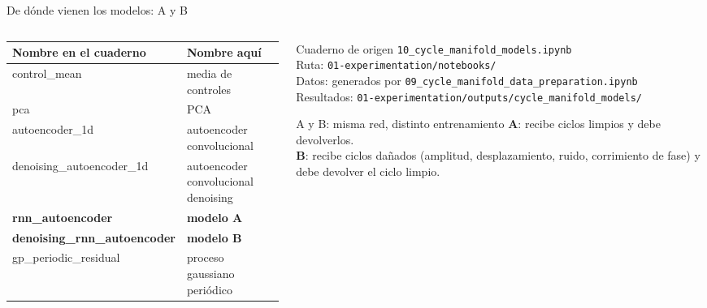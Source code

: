 \documentclass[aspectratio=169,10pt,t]{beamer}
\begin{document}
\begin{frame}{De dónde vienen los modelos: A y B}
\begin{columns}[T]
\begin{column}{0.56\textwidth}
\footnotesize
\renewcommand{\arraystretch}{1.15}
\begin{tabularx}{\textwidth}{@{}>{\ttfamily\raggedright\arraybackslash}p{3.7cm}>{\raggedright\arraybackslash}X@{}}
\toprule
\textnormal{\textbf{Nombre en el cuaderno}} & \textbf{Nombre aquí}\\
\midrule
control\_mean & media de controles\\
pca & PCA\\
autoencoder\_1d & autoencoder convolucional\\
denoising\_autoencoder\_1d & autoencoder convolucional denoising\\
\rowcolor{naranjac}\textbf{rnn\_autoencoder} & \textbf{modelo A}\\
\rowcolor{naranjac}\textbf{denoising\_rnn\_autoencoder} & \textbf{modelo B}\\
gp\_periodic\_residual & proceso gaussiano periódico\\
\bottomrule
\end{tabularx}
\end{column}
\begin{column}{0.42\textwidth}
\begin{block}{Cuaderno de origen}\scriptsize
\texttt{10\_cycle\_manifold\_models.ipynb}\\
Ruta: \texttt{01-experimentation/notebooks/}\\
Datos: generados por \texttt{09\_cycle\_manifold\_data\_preparation.ipynb}\\
Resultados: \texttt{01-experimentation/outputs/cycle\_manifold\_models/}
\end{block}
\begin{exampleblock}{A y B: misma red, distinto entrenamiento}\scriptsize
\textbf{A}: recibe ciclos limpios y debe devolverlos.\\
\textbf{B}: recibe ciclos dañados (amplitud, desplazamiento, ruido, corrimiento de fase) y debe devolver el ciclo limpio.
\end{exampleblock}
\end{column}
\end{columns}
\end{frame}
\end{document}
